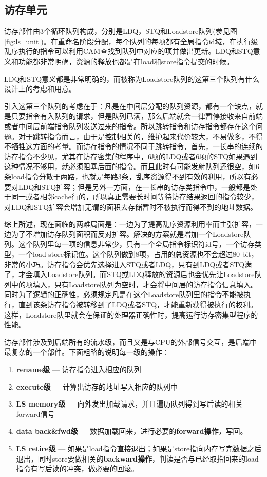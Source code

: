 \subsection{访存单元}\label{subsec:ls_unit}

访存部件由3个循环队列构成，分别是LDQ，STQ和Loadstore队列(参见图\ref{fig:ls_unit})。在重命名阶段分配，每个队列的每项都有全局指令id域，在执行级乱序执行的指令可以利用CAM查找到队列中对应的项并做出更新。LDQ和STQ意义和功能都非常明确，资源的释放也都是在load和store指令提交的时候。

LDQ和STQ意义都是非常明确的，而被称为Loadstore队列的这第三个队列有什么设计上的考虑和用意。

引入这第三个队列的考虑在于：凡是在中间层分配的队列资源，都有一个缺点，就是只要指令有入队列的请求，但是队列已满，那么后端就会一律暂停接收来自前端或者中间层前端指令队列发送过来的指令。所以跳转指令和访存指令都存在这个问题。对于跳转指令而言，由于是控制相关的，维护起来代价较大，不易做多，不得不牺牲这方面的考量。而访存指令的情况不同于跳转指令，首先，一长串的连续的访存指令不少见，尤其在访存密集的程序中，6项的LDQ或者6项的STQ如果遇到这种情况不够用，就必须阻塞后面的指令。而且此时有可能发射队列还很空，如6条load指令分散于两路，也就是每路3条，乱序资源得不到有效的利用，所以有必要对LDQ和STQ扩容；但是另外一方面，在一长串的访存类指令中，一般都是处于同一或者相邻cache行的，所以真正需要长时间等待访存结果返回的指令较少，对LDQ和STQ扩容会增加无谓的面积去存储暂时不被执行而得不到的地址数据。

综上所述，现在面临的两难局面是：一边为了提高乱序资源利用率而主张扩容，一边为了不增加访存队列面积而反对扩容。解决的方案就是增加一个Loadstore队列。这个队列里每一项的信息非常少，只有一个全局指令标识符id号，一个访存类型，一个load-store标记位。这个队列做到8项，占用的总资源也不会超过80-bit，非常的小巧。访存指令会优先选择进入STQ或者LDQ，只有到LDQ或者STQ满了，才会填入Loadstore队列。而STQ或LDQ释放的资源后也会优先让Loadstore队列中的项填入，只有Loadstore队列为空时，才会将中间层的访存指令信息填入。同时为了逻辑的正确性，必须规定凡是在这个Loadstore队列里的指令不能被执行，直到该条访存指令被转移到了LDQ或者STQ，才能重新获得被执行的权利。这样，Loadstore队里就会在保证的处理器正确性时，提高运行访存密集型程序的性能。

访存部件涉及到后端所有的流水级，而且又是与CPU的外部信号交互，是后端中最复杂的一个部件。下面粗略的说明每一级的操作：
\begin{enumerate}[label=(\alph*)]
	\item \textbf{rename级} --- 访存指令进入相应的队列
	\item \textbf{execute级} --- 计算出访存的地址写入相应的队列中
	\item \textbf{LS memory级} --- 向外发出加载请求，并且遍历队列得到写后读的相关forward信号
	\item \textbf{data back\&fwd级} --- 数据加载回来，进行必要的\textbf{forward操作}，写回。
	\item \textbf{LS retire级} --- 如果是load指令直接退出；如果是store指向内存写完数据之后退出，同时store要做相关的\textbf{backward操作}，判读是否与已经取指回来的load指令有写后读的冲突，做必要的回滚。
\end{enumerate}

